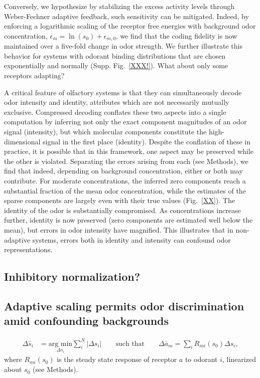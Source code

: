 Conversely, we hypothesize by stabilizing the excess activity levels through Weber-Fechner adaptive feedback, such sensitivity can be mitigated. Indeed, by enforcing a logarithmic scaling of the receptor free energies with background odor concentration, $\epsilon_m = \ln(s_0) + \epsilon_{m, 0}$, we find that the coding fidelity is now maintained over a five-fold change in odor strength. We further illustrate this behavior for systems with odorant binding distributions that are chosen exponentially and normally (Supp. Fig.~\ref{XXX!}). {\color{blue} What about only some receptors adapting?}



A critical feature of olfactory systems is that they can simultaneously decode odor intensity and identity, attributes which are not necessarily mutually exclusive. Compressed decoding conflates these two aspects into a single computation by inferring not only the exact component magnitudes of an odor signal (intensity), but which molecular components constitute the high-dimensional signal in the first place (identity). Despite the conflation of these in practice, it is possible that in this framework, one aspect may be preserved while the other is violated. Separating the errors arising from each (see Methods), we find that indeed, depending on background concentration, either or both may contribute. For moderate concentrations, the inferred zero components reach a substantial fraction of the mean odor concentration, while the estimates of the sparse components are largely even with their true values (Fig.~\ref{XX}). The identity of the odor is substantially compromised. As concentrations increase further, identity is now preserved (zero components are estimated well below the mean), but errors in odor intensity have magnified. This illustrates that in non-adaptive systems, errors both in identity and intensity can confound odor representations. 

\subsection*{Inhibitory normalization?}

\subsection*{Adaptive scaling permits odor discrimination amid confounding backgrounds}



\begin{align}
\Delta \hat s_i &= \underset{\Delta s_i}{\text{arg min}} \sum_i^N|\Delta s_i| \qquad \text{such that} \qquad \Delta \bar a_m = \sum_i R_{mi}(s_0) \Delta s_i,
\end{align}
where $R_{mi}(s_0)$ is the steady state response of receptor $a$ to odorant $i$, linearized about $s_0$ (see Methods). 


